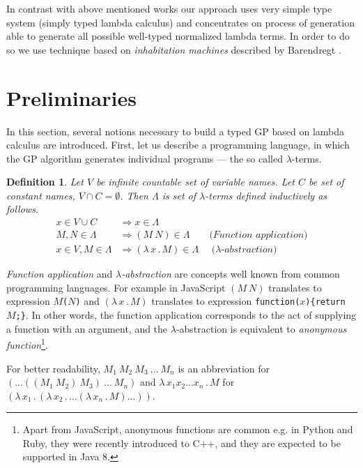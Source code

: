 \documentclass{sig-alternate}
\newtheorem{definition}{Definition}
\newcommand{\lets}{let us\xspace}
\newcommand{\lterms}{$\lambda$-terms\xspace}
\newcommand{\then}{\Rightarrow\xspace}
\newcommand{\lamb}[2]{( \lambda \, #1 \, . \, #2 )}
\newcommand{\lam}[2]{\lambda \, #1 \, . \, #2}
\begin{document}
In contrast with above mentioned works our approach uses very simple type system 
(simply typed lambda calculus) and concentrates on process of generation  
able to generate all possible well-typed normalized lambda terms. In order to do
so we use technique based on \textit{inhabitation machines} 
described by Barendregt \cite{barendregt10}.    



\section{Preliminaries}
\label{preliminaries}

In this section, several notions necessary to build a typed GP based on lambda calculus are introduced. 
First, \lets describe a programming language, 
in which the GP algorithm generates individual programs --- the so called \lterms.

\begin{definition}
Let $V$ be infinite countable set of {\it 
variable names}. Let $C$ be set of {\it constant names}, 
$V \cap C = \emptyset$.	 	
Then $\Lambda$ is set of {\it \lterms} defined inductively as follows.	
\begin{align*}
x   \in V \cup C  &\then x     \in \Lambda \\
M,N \in \Lambda   &\then (M~N) \in \Lambda 
\textit{~~~~~~(Function application)} \\
x   \in V , M \in \Lambda &\then \lamb{x}{M} \in \Lambda
\textit{~~~~($\lambda$-abstraction)} 
\end{align*}
\end{definition}


\textit{Function application} and 
\textit{$\lambda$-abstraction} are concepts
well known from common programming languages. 
For example in JavaScript 
$(M~N)$ translates to expression \texttt{$M$($N$)} and
$\lamb{x}{M}$ translates to expression \texttt{function($x$)\{return $M$;\}}.
In other words, the function application 
corresponds to the act of supplying a function 
with an argument, and
the $\lambda$-abstraction is equivalent to 
\textit{anonymous function}\footnote{Apart from JavaScript, anonymous functions are common e.g. in Python and Ruby, 
they were recently introduced to C++, and they are expected to be supported in Java 8.}.

For better readability, 
$M_1~M_2~M_3~\dots~M_n$ is an abbreviation for
$(\dots((M_1~M_2)~M_3)~\dots~M_n)$
and $\lam{x_1 x_2 \dots x_n }{M}$ for 
$\lamb{x_1}{\lamb{x_2}{\dots\lamb{x_n}{M}\dots}}$.
\end{document}
